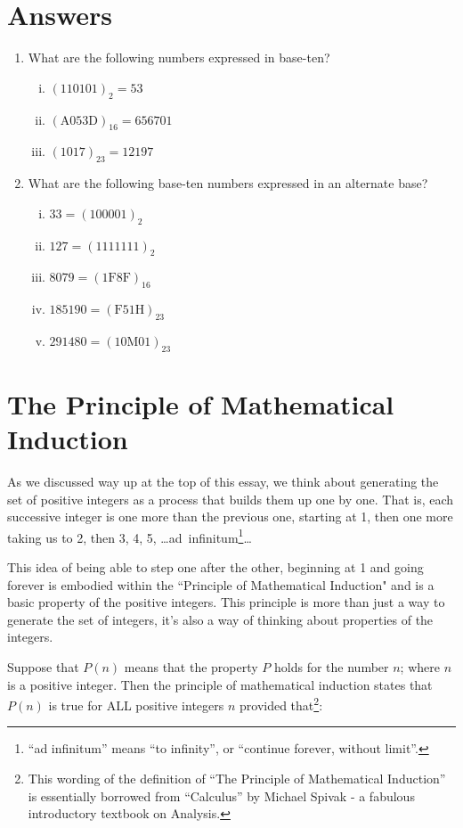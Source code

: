 \documentclass{article}
\begin{document}
\section*{Answers}
\begin{enumerate}
\item What are the following numbers expressed in base-ten?
\begin{enumerate}[i)]
\item $(110101)_2 = 53$
\item $(\text{A}053\text{D})_{16}=656701$
\item $(1017)_{23} = 12197$
\end{enumerate}
\item What are the following base-ten numbers expressed in an alternate base?
\begin{enumerate}[i)]
\item $33 = (100001)_2$
\item $127 = (1111111)_2$
\item $8079 = (1\text{F}8\text{F})_{16}$
\item $185190 = (\text{F}51\text{H})_{23}$
\item $291480 = (10\text{M}01)_{23}$
\end{enumerate}
\end{enumerate}

\break
\section*{The Principle of Mathematical Induction}

As we discussed way up at the top of this essay,
we think about generating the set of positive integers as a process that builds them up one by one.
That is, each successive integer is one more than the previous one,
starting at 1, then one more
taking us to 2,
then 3, 4, 5, \dots{}ad~infinitum\footnote{``ad infinitum'' means ``to infinity'', or ``continue forever, without limit''.}\dots

This idea of being able to step one after the other,
beginning at 1 and going forever is embodied within the ``Principle of Mathematical
Induction" and is a basic property of the positive integers.
This principle is more than just a way to generate the set of integers,
it's also a way of thinking about properties of the integers.

Suppose
that $P(n)$ means that the property $P$ holds
for the number $n$; where $n$ is a positive integer.
Then the principle of mathematical induction states that $P(n)$
is true for ALL positive integers $n$ provided that\footnote{This wording of the
definition of ``The Principle of Mathematical Induction'' is essentially borrowed
from ``Calculus'' by Michael Spivak - a fabulous introductory textbook on Analysis.}:
\end{document}
